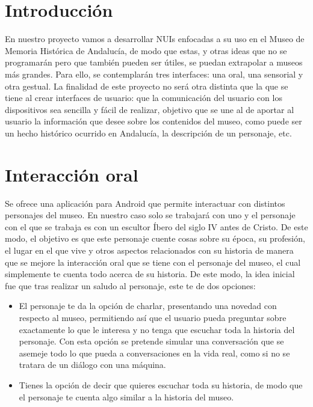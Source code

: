 \newpage %

\tableofcontents %


\newpage

\section{Introducción}

En nuestro proyecto vamos a desarrollar NUIs enfocadas a su uso en el Museo de Memoria Histórica de Andalucía, de modo que estas, y otras ideas que no se programarán pero que también pueden ser útiles, se puedan extrapolar a museos más grandes. Para ello, se contemplarán tres interfaces: una oral, una sensorial y otra gestual. La finalidad de este proyecto no será otra distinta que la que se tiene al crear interfaces de usuario: que la comunicación del usuario con los dispositivos sea sencilla y fácil de realizar, objetivo que se une al de aportar al usuario la información que desee sobre los contenidos del museo, como puede ser un hecho histórico ocurrido en Andalucía, la descripción de un personaje, etc.

\section{Interacción oral}

Se ofrece una aplicación para Android que permite interactuar con distintos personajes del museo. En nuestro caso solo se trabajará con uno y el personaje con el que se trabaja es con un escultor Íbero del siglo IV antes de Cristo. De este modo, el objetivo es que este personaje cuente cosas sobre su época, su profesión, el lugar en el que vive y otros aspectos relacionados con su historia de manera que se mejore la interacción oral que se tiene con el personaje del museo, el cual simplemente te cuenta todo acerca de su historia. De este modo, la idea inicial fue que tras realizar un saludo al personaje, este te de dos opciones:

\begin{itemize}
	\item El personaje te da la opción de charlar, presentando una novedad con respecto al museo, permitiendo así que el usuario pueda preguntar sobre exactamente lo que le interesa y no tenga que escuchar toda la historia del personaje. Con esta opción se pretende simular una conversación que se asemeje todo lo que pueda a conversaciones en la vida real, como si no se tratara de un diálogo con una máquina. 
	
	\item Tienes la opción de decir que quieres escuchar toda su historia, de modo que el personaje te cuenta algo similar a la historia del museo. 
\end{itemize}

